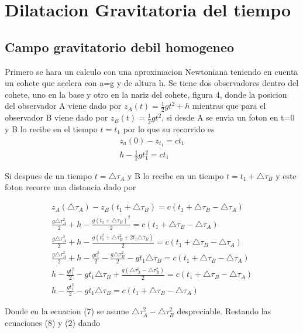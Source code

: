 \documentclass[12pt,twoside]{rif}
\begin{document}
\section{Dilatacion Gravitatoria del tiempo}
	\subsection{Campo gravitatorio debil homogeneo}
	Primero se hara un calculo con una aproximacion Newtoniana teniendo en cuenta un cohete que acelera con a=g y de altura h. Se tiene dos observadores dentro del cohete, uno en la base y otro en la nariz del cohete, figura 4, donde la posicion del observador A viene dado por $z_{A}(t)=\frac{1}{2}gt^{2}+h $ mientras que para el observador B viene dado por $z_{B}(t)=\frac{1}{2}gt^{2}$, si desde A se envia un foton en t=0 y B lo recibe en el tiempo $t=t_{1}$ por lo que su recorrido es
\begin{eqnarray}
z_{a}(0)-z_{t_{1}}=ct_{1} \\
h-\frac{1}{2}gt_{1}^{2}=ct_{1}
\end{eqnarray}

Si despues de un tiempo $t=\triangle\tau_{A} $ y B lo recibe en un tiempo 
$ t=t_{1}+\triangle\tau_{B} $ y este foton recorre una distancia dado por

\begin{eqnarray}
z_{A}(\triangle\tau_{A})-z_{B}(t_{1}+\triangle\tau_{B})=c(t_{1}+\triangle\tau_{B}-\triangle\tau_{A}) \\
\frac{g\triangle\tau_{A}^{2}}{2}+h-\frac{g(t_{1}+\triangle\tau_{B})^{2}}{2}=c(t_{1}+\triangle\tau_{B}-\triangle\tau_{A}) \\
\frac{g\triangle\tau_{A}^{2}}{2}+h-\frac{g(t_{1}^{2}+\triangle\tau_{B}^{2}+2t_{1}\triangle\tau_{B})}{2}=c(t_{1}+\triangle\tau_{B}-\triangle\tau_{A}) \\
\frac{g\triangle\tau_{A}^{2}}{2}+h-\frac{gt_{1}^2}{2}-\frac{g\triangle\tau_{B}^{2}}{2}-gt_{1}\triangle\tau_{B}=c(t_{1}+\triangle\tau_{B}-\triangle\tau_{A})\\
h-\frac{gt_{1}^{2}}{2}-gt_{1}\triangle\tau_{B}+\frac{g(\triangle\tau_{A}^{2}-\triangle\tau_{B}^{2})}{2}=c(t_{1}+\triangle\tau_{B}-\triangle\tau_{A})\\
h-\frac{gt_{1}^{2}}{2}-gt_{1}\triangle\tau_{B}=c(t_{1}+\triangle\tau_{B}-\triangle\tau_{A})
\end{eqnarray}

Donde en la ecuacion (7) se asume $\triangle\tau_{A}^{2}-\triangle\tau_{B}^{2}$ despreciable. Restando las ecuaciones (8) y (2) dando
\end{document}
